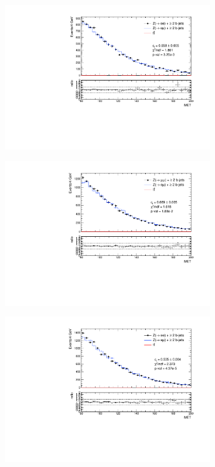 \documentclass{article}
\begin{document}
\begin{figure}
\begin{center}
\begin{subfigure}[b]{0.45\textwidth}
		\includegraphics[width=\linewidth]{Zee_MET_2017.pdf}
	\end{subfigure}
	\begin{subfigure}[b]{0.45\textwidth}
		\includegraphics[width=\linewidth]{Zmm_MET_2017.pdf}
	\end{subfigure}
	\begin{subfigure}[b]{0.45\textwidth}
		\includegraphics[width=\linewidth]{Zee_MET_2018.pdf}

\end{subfigure}
\end{center}
\end{figure}
\end{document}
